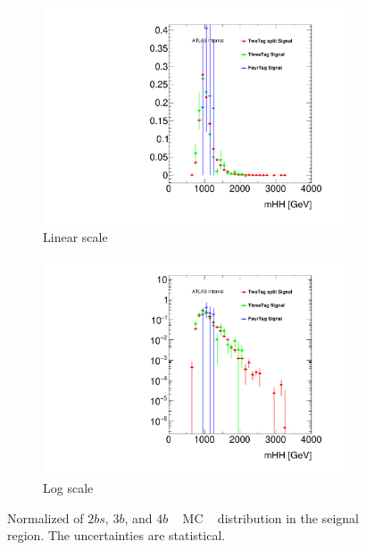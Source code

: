 \begin{figure}[htbp!]
  \centering
  \captionsetup{justification=centering}
  \hspace{-0.5cm}
    \begin{subfigure}[b]{0.45\textwidth}
        \includegraphics[width=\textwidth,angle=-90]{figures/boosted/Other/ttbar_compare_mHH_l.pdf}
        \caption{Linear scale}
        \label{fig:ttshapeComp_lin}
    \end{subfigure}
    \quad
    \begin{subfigure}[b]{0.45\textwidth}
        \includegraphics[width=\textwidth,angle=-90]{figures/boosted/Other/ttbar_compare_mHH_l_1.pdf}
        \caption{Log scale}
        \label{fig:ttshapeComp_log}
    \end{subfigure}
   \caption{Normalized of $2bs$, $3b$, and $4b$ \ttbar~ MC \mtwoJ~ distribution in the seignal region. The uncertainties are statistical.}
  \label{fig:ttshapeComp}
\end{figure}


